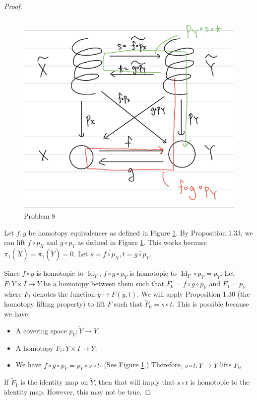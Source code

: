 \documentclass[12pt, psamsfonts]{amsart}
\theoremstyle{definition}
\theoremstyle{remark}
\DeclareMathOperator{\Id}{Id}
\numberwithin{equation}{section}
\begin{document}
\begin{proof}
  \begin{figure}
    \includegraphics[width=.5\linewidth]{problem8_diagram.jpeg}
    \caption{Problem 8}
    \label{fig:problem8_diagram}
  \end{figure}
  Let $f, g$ be homotopy equivalences as defined in Figure \ref{fig:problem8_diagram}.
  By Proposition 1.33, we can lift $f \circ p_X$ and $g \circ p_Y$ as defined in Figure \ref{fig:problem8_diagram}.
  This works because $\pi_1(\tilde{X}) = \pi_1(\tilde{Y}) = 0$.
  Let $s = \widetilde{f \circ p_X}, t = \widetilde{g \circ p_Y}$.

  Since $f \circ g$ is homotopic to $\Id_Y$, $f \circ g \circ p_Y$ is homotopic to $\Id_Y \circ p_Y = p_Y$.
  Let $F: \tilde{Y} \times I \rightarrow Y$ be a homotopy between them such that $F_0 = f \circ g \circ p_Y$ and $F_1 = p_Y$ where $F_t$ denotes the function $\tilde{y} \mapsto F(\tilde{y}, t)$.
  We will apply Proposition 1.30 (the homotopy lifting property) to lift $F$ such that $\tilde{F}_0 = s \circ t$.
  This is possible because we have:
  \begin{itemize}
    \item
      A covering space $p_Y: \tilde{Y} \rightarrow Y$.
    \item
      A homotopy $F_t: \tilde{Y} \times I \rightarrow Y$.
    \item
      We have $f \circ g \circ p_Y = p_Y \circ s \circ t$.
      (See Figure \ref{fig:problem8_diagram}.)
      Therefore, $s \circ t: \tilde{Y} \rightarrow \tilde{Y}$ lifts $F_0$.
  \end{itemize}

  If $\tilde{F}_1$ is the identity map on $\tilde{Y}$, then that will imply that $s \circ t$ is homotopic to the identity map.
  However, this may not be true.


\end{proof}
\end{document}

